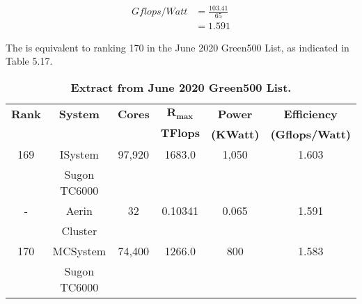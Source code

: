 \begin{align}
Gflops/Watt &= \frac{103.41}{65} \\
            &= 1.591
\end{align}

The is equivalent to ranking 170 in the June 2020 Green500 List, as indicated in Table 5.17.

\begin{table}[H]
\begin{center}
\begin{tabular}{ |c|c|c|c|c|c| } 
\hline
\textbf{Rank} & \textbf{System} & \textbf{Cores} & \textbf{$\mathbf{R_{max}}$} & \textbf{Power}   & \textbf{Efficiency} \\
              &                 &                & \textbf{$\mathbf{TFlops}$} & \textbf{(KWatt)} & \textbf{(Gflops/Watt)} \\ 
\hline
169 & ISystem      & 97,920 & 1683.0 & 1,050 & 1.603 \\
    & Sugon TC6000 &        &        &       &       \\               
\hline
 -  & Aerin     & 32     & 0.10341 & 0.065 & 1.591 \\
    & Cluster   &        &        &       &       \\               
\hline
170 & MCSystem      & 74,400 & 1266.0 & 800 & 1.583 \\
    & Sugon TC6000 &        &        &       &       \\               
\hline
\end{tabular}
\end{center}
\caption{\label{tab:table-name}\textbf{Extract from June 2020 Green500 List.}}
\end{table}









